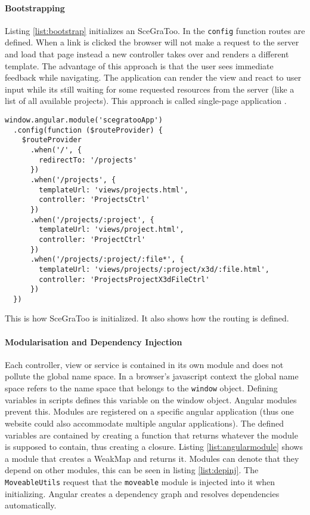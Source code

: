 \paragraph{Bootstrapping}
\label{par:Bootstrapping and Routing}

Listing \ref{list:bootstrap} initializes an SceGraToo. In the \texttt{config}
function routes are defined. When a link is clicked the browser will not make a
request to the server and load that page instead a new controller takes over and
renders a different template. The advantage of this approach is that the user
sees immediate feedback while navigating. The application can render the view and
react to user input while its still waiting for some requested resources from
the server (like a list of all available projects). This approach is called
single-page application \cite{Mikowski:2013:SPW:2663433}.

\begin{listing}
  \begin{verbatim}
window.angular.module('scegratooApp')
  .config(function ($routeProvider) {
    $routeProvider
      .when('/', {
        redirectTo: '/projects'
      })
      .when('/projects', {
        templateUrl: 'views/projects.html',
        controller: 'ProjectsCtrl'
      })
      .when('/projects/:project', {
        templateUrl: 'views/project.html',
        controller: 'ProjectCtrl'
      })
      .when('/projects/:project/:file*', {
        templateUrl: 'views/projects/:project/x3d/:file.html',
        controller: 'ProjectsProjectX3dFileCtrl'
      })
  })
  \end{verbatim}
  \caption{This is how SceGraToo is initialized. It also shows how the routing is defined.}
  \label{list:bootstrap}
\end{listing}

\paragraph{Modularisation and Dependency Injection}
\label{par:modularisation}

Each controller, view or service is contained in its own module and does not
pollute the global name space. In a browser's javascript context the global
name space refers to the name space that belongs to the \texttt{window} object.
Defining variables in scripts defines this variable on the window object.
Angular modules prevent this. Modules are registered on a specific angular
application (thus one website could also accommodate multiple angular
applications). The defined variables are contained by creating a function that
returns whatever the module is supposed to contain, thus creating a closure.
Listing \ref{list:angularmodule} shows a module that creates a WeakMap and
returns it. Modules can denote that they depend on other modules, this can be
seen in listing \ref{list:depinj}. The \texttt{MoveableUtils} request that the
\texttt{moveable} module is injected into it when initializing. Angular creates
a dependency graph and resolves dependencies automatically.


